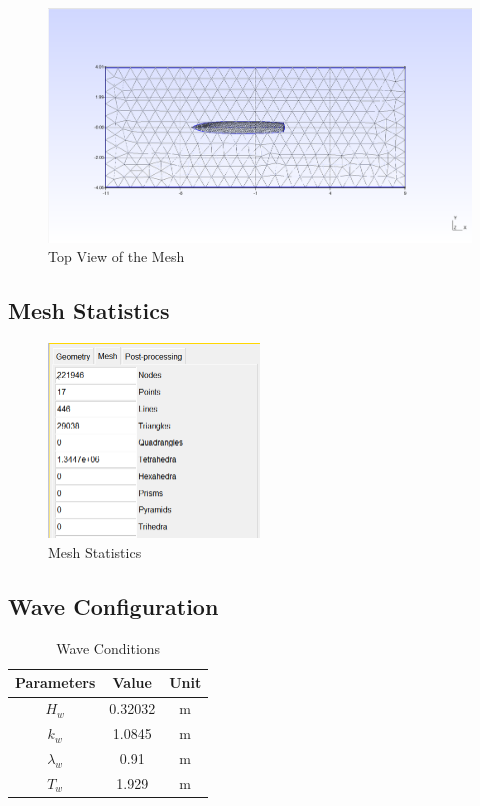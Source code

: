 \documentclass[12pt]{article} %
\begin{document}
\begin{figure}[ht]
    \centering
    \includegraphics[width=1\textwidth]{Mesh_4.png}
    \caption{Top View of the Mesh}
\end{figure}
\clearpage
\subsection{Mesh Statistics}
\begin{figure}[ht]
    \centering
    \includegraphics[width=0.5\textwidth]{MS.png}
    \caption{Mesh Statistics}
\end{figure}
\subsection{Wave Configuration}
\begin{table}[ht]
    \caption{Wave Conditions}
    \centering
    \begin{tabular}{|c|c|c|}
        \hline
        Parameters & Value & Unit\\
        \hline   
        $H_w$ & 0.32032 & m \\
        $k_w$ & 1.0845 & m\\
        $\lambda_w$ & 0.91 & m\\
        $T_w$ & 1.929 & m \\
        \hline
    \end{tabular}
\end{table}
\end{document}
